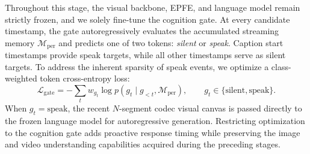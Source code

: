 Throughout this stage, the visual backbone, EPFE, and language model remain strictly frozen, and we solely fine-tune the cognition gate. At every candidate timestamp, the gate autoregressively evaluates the accumulated streaming memory $\mathcal{M}_{\mathrm{per}}$ and predicts one of two tokens: \emph{silent} or \emph{speak}. Caption start timestamps provide speak targets, while all other timestamps serve as silent targets. To address the inherent sparsity of speak events, we optimize a class-weighted token cross-entropy loss:
\[
\mathcal{L}_{\mathrm{gate}}
=
-\sum_t w_{g_t}\log p(g_t \mid g_{<t}, \mathcal{M}_{\mathrm{per}}),
\qquad g_t\in\{\text{silent},\text{speak}\}.
\]
When $g_t=\text{speak}$, the recent $N$-segment codec visual canvas is passed directly to the frozen language model for autoregressive generation. Restricting optimization to the cognition gate adds proactive response timing while preserving the image and video understanding capabilities acquired during the preceding stages.